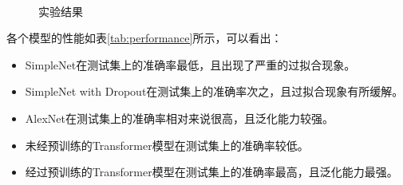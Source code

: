 \begin{figure}[H]
     \\
    \caption{实验结果}
    \label{fig:results}
\end{figure}

各个模型的性能如表\ref{tab:performance}所示，可以看出：

\begin{itemize}
    \item SimpleNet在测试集上的准确率最低，且出现了严重的过拟合现象。
    \item SimpleNet with Dropout在测试集上的准确率次之，且过拟合现象有所缓解。
    \item AlexNet在测试集上的准确率相对来说很高，且泛化能力较强。
    \item 未经预训练的Transformer模型在测试集上的准确率较低。
    \item 经过预训练的Transformer模型在测试集上的准确率最高，且泛化能力最强。
\end{itemize}

